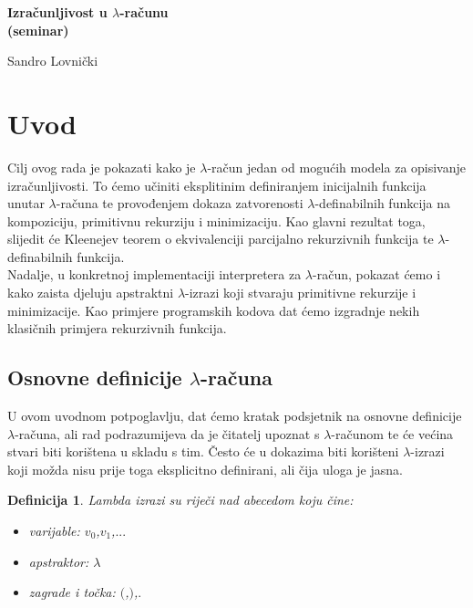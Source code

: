 \documentclass[a4paper,12pt]{article}
\newtheorem{defn}[thm]{Definicija}
\begin{document}
\begin{titlepage}
    \centering
    \vspace*{\fill}
    \huge\bfseries
    Izračunljivost u $\lambda$-računu \\ \small(seminar)
    \vspace*{0.5cm}

    \small Sandro Lovnički
    \vspace*{\fill}
\end{titlepage}

\tableofcontents %
\newpage

\section{Uvod}

\qquad Cilj ovog rada je pokazati kako je $\lambda$-račun jedan od mogućih modela za opisivanje izračunljivosti. To ćemo učiniti eksplitinim definiranjem inicijalnih funkcija unutar $\lambda$-računa te provođenjem dokaza zatvorenosti $\lambda$-definabilnih funkcija na kompoziciju, primitivnu rekurziju i minimizaciju. Kao glavni rezultat toga, slijedit će Kleenejev teorem o ekvivalenciji parcijalno rekurzivnih funkcija te $\lambda$-definabilnih funkcija.\\
Nadalje, u konkretnoj implementaciji interpretera za $\lambda$-račun, pokazat ćemo i kako zaista djeluju apstraktni $\lambda$-izrazi koji stvaraju primitivne rekurzije i minimizacije. Kao primjere programskih kodova dat ćemo izgradnje nekih klasičnih primjera rekurzivnih funkcija.

\subsection{Osnovne definicije $\lambda$-računa}

U ovom uvodnom potpoglavlju, dat ćemo kratak podsjetnik na osnovne definicije $\lambda$-računa, ali rad podrazumijeva da je čitatelj upoznat s $\lambda$-računom te će većina stvari biti korištena u skladu s tim. Često će u dokazima biti korišteni $\lambda$-izrazi koji možda nisu prije toga eksplicitno definirani, ali čija uloga je jasna.

\begin{defn} Lambda izrazi su riječi nad abecedom koju čine:
\begin{itemize}
	\item varijable: $v_0$,$v_1$,$...$
	\item apstraktor: $\lambda$
	\item zagrade i točka: $($,$)$,$.$
\end{itemize}
\end{defn}
\end{document}
